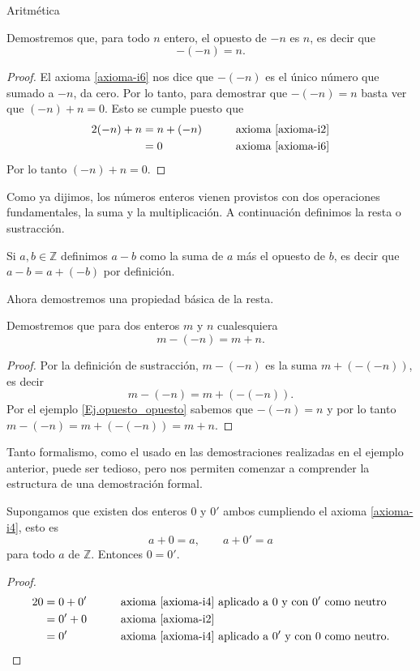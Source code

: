\begin{section}{Aritmética}
\begin{ejemplo}\label{Ej.opuesto_opuesto} Demostremos que, para todo $n$ entero, el opuesto de $-n$ es $n$, es decir que 
$$-(-n) = n.$$ 
\end{ejemplo}
\begin{proof} El axioma \ref{axioma-i6} nos dice que $-(-n)$ es el único número que sumado a $-n$, da cero.  Por lo tanto, para demostrar que $-(-n) = n$ basta ver que $(-n)+n=0$. Esto se cumple puesto que 
\begin{alignat*}2
(-n)+n&=n+(-n) &\qquad &\text{axioma \ref{axioma-i2}} \\
&=0&\qquad &\text{axioma \ref{axioma-i6}}
\end{alignat*}
Por lo tanto  $(-n)+n=0$.
\end{proof}

Como ya dijimos, los números enteros vienen provistos con dos operaciones fundamentales, la suma y la multiplicación.
A continuación definimos la resta o sustracción. 

\begin{definicion} Si $a,b\in\mathbb{Z}$ definimos $a-b$ como la suma de $a$ más el opuesto de $b$, es decir que  $a-b=a+(-b)$ por definición.  
\end{definicion}

Ahora demostremos una propiedad básica de la resta.

\begin{ejemplo*} Demostremos que para dos enteros $m$ y $n$ cualesquiera
$$m-(-n) = m+n.$$ 
\end{ejemplo*}
\begin{proof} Por la definición de sustracción, $m-(-n)$ es la suma $m+(-(-n))$, es decir 
$$m-(-n)=m+(-(-n)).$$ 
Por el ejemplo \ref{Ej.opuesto_opuesto} sabemos que $-(-n)=n$ y por lo tanto $m-(-n)=m+(-(-n))=m+n$.
\end{proof}

Tanto formalismo, como el usado en las  demostraciones realizadas en el ejemplo anterior, puede ser tedioso, pero nos permiten comenzar a comprender la estructura de una demostración formal. 



\begin{ejemplo*} Supongamos que existen dos enteros $0$ y $0'$ ambos cumpliendo el  axioma \ref{axioma-i4}, esto es
$$
a+0= a, \qquad a+0'=a
$$
para todo $a$ de $\mathbb Z$.  Entonces $0= 0'$. 
\end{ejemplo*}
\begin{proof}
\begin{alignat*}2
0 &= 0 + 0'&\qquad &\text{axioma \ref{axioma-i4} aplicado a $0$ y con $0'$ como neutro} \\
&=0'+0&\qquad &\text{axioma \ref{axioma-i2}}\\
&= 0' &\qquad &\text{axioma \ref{axioma-i4} aplicado a $0'$ y con $0$ como neutro}.
\end{alignat*}
\end{proof}



\end{section}
